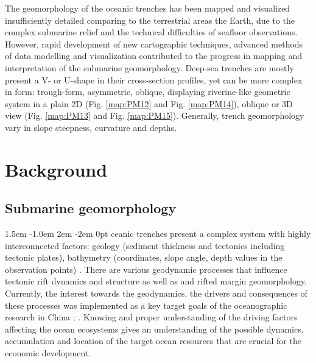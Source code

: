 \documentclass[11pt,a4paper]{report}
\def\pstart#1{\noindent\smash{\lower1.5ex\hbox{\llap{\Cal#1}}\hskip-.1ex}
  \parshape=3 1.5em \dimexpr\hsize-1.0em 2em \dimexpr\hsize-2em 0pt \hsize}
\begin{document}
The geomorphology of the oceanic trenches has been mapped and visualized insufficiently detailed comparing to the terrestrial areas the Earth, due to the complex submarine relief and the technical difficulties of seafloor observations. However, rapid development of new cartographic techniques, advanced methods of data modelling and visualization contributed to the progress in mapping and interpretation of the submarine geomorphology. Deep-sea trenches are mostly present a V- or U-shape in their cross-section profiles, yet can be more complex in form: trough-form, asymmetric, oblique, displaying riverine-like geometric system in a plain 2D (Fig. \ref{map:PM12} and Fig. \ref{map:PM14}), oblique or 3D view (Fig. \ref{map:PM13} and Fig. \ref{map:PM15}). Generally, trench geomorphology vary in slope steepness, curvature and depths. 

\pagebreak
\section{Background}
\subsection{Submarine geomorphology}
\pstart Oceanic trenches present a complex system with highly interconnected factors: geology (sediment thickness and tectonics including tectonic plates), bathymetry (coordinates, slope angle, depth values in the observation points) \cite{Lemenkova202008}. There are various geodynamic processes that influence tectonic rift dynamics and structure as well as and rifted margin geomorphology. Currently, the interest towards the geodynamics, the drivers and consequences of these processes was implemented as a key target goals of the oceanographic research in China \cite{Cuietal2014a}; \cite{Cui-Wu2018}. Knowing and proper understanding of the driving factors affecting the ocean ecosystems gives an understanding of the possible dynamics, accumulation and location of the target ocean resources that are crucial for the economic development. 
\end{document}
